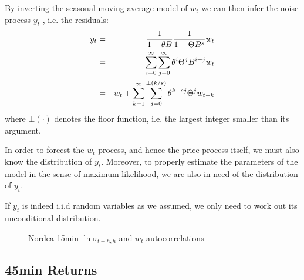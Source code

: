 \documentclass{book}
\begin{document}
By inverting the seasonal moving average model of $w_t$ we can then
infer the noise process $y_t$ \footnotemark, i.e. the residuals:
\begin{eqnarray*}
  y_t &=& {1 \over 1 - \theta B}{1 \over 1 - \Theta B^s} w_t \\
  &=& \sum_{i=0}^{\infty}\sum_{j=0}^{\infty} \theta^i \Theta^j B^{i+j}
  w_t \\
  &=& w_t + \sum_{k=1}^{\infty} \sum_{j=0}^{\bot(k/s)} \theta^{k-sj} \Theta^j
  w_{t-k}
\end{eqnarray*}
where $\bot(\cdot)$ denotes the floor function, i.e. the largest
integer smaller than its argument.

In order to forecst the $w_t$ process, and hence the price process
itself, we must also know the distribution of $y_t$. Moreover, to
properly estimate the parameters of the model in the sense of maximum
likelihood, we are also in need of the distribution of $y_t$.

If $y_t$ is indeed i.i.d random variables as we assumed, we only need
to work out its unconditional distribution.

\begin{figure}[htb!]
  \centering
  \caption{Nordea 15min $\ln\sigma_{t+h, h}$ and $w_t$ autocorrelations}
\end{figure}
\subsection{45min Returns}




\end{document}
